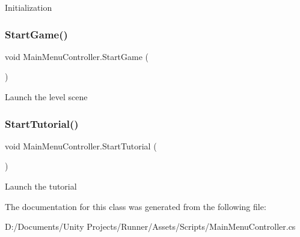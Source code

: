 Initialization \mbox{\label{class_main_menu_controller_af693059f9f9b501929d35b23257f83ea}} 
\subsubsection{\texorpdfstring{Start\+Game()}{StartGame()}}
{\footnotesize\ttfamily void Main\+Menu\+Controller.\+Start\+Game (\begin{DoxyParamCaption}{ }\end{DoxyParamCaption})}

Launch the level scene \mbox{\label{class_main_menu_controller_ad5a70ec49582ee8eed0d488c0b3a65c1}} 
\subsubsection{\texorpdfstring{Start\+Tutorial()}{StartTutorial()}}
{\footnotesize\ttfamily void Main\+Menu\+Controller.\+Start\+Tutorial (\begin{DoxyParamCaption}{ }\end{DoxyParamCaption})}

Launch the tutorial 

The documentation for this class was generated from the following file\+:\begin{DoxyCompactItemize}
\item 
D\+:/\+Documents/\+Unity Projects/\+Runner/\+Assets/\+Scripts/Main\+Menu\+Controller.\+cs\end{DoxyCompactItemize}
